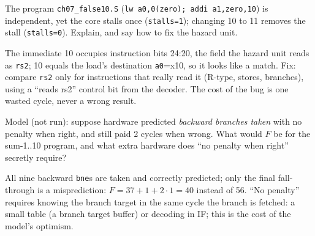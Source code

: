 \begin{exercise}[hard]\label{ex:h07d}
The program \texttt{ch07\_false10.S} (\texttt{lw a0,0(zero);
addi a1,zero,10}) is independent, yet the core stalls once
(\texttt{stalls=1}); changing 10 to 11 removes the stall
(\texttt{stalls=0}). Explain, and say how to fix the hazard unit.
\end{exercise}
\begin{solution}[hint]
The immediate 10 occupies instruction bits 24:20, the field the hazard
unit reads as \texttt{rs2}; 10 equals the load's destination
\texttt{a0}=x10, so it looks like a match. Fix: compare \texttt{rs2}
only for instructions that really read it (R-type, stores, branches),
using a ``reads rs2'' control bit from the decoder. The cost of the
bug is one wasted cycle, never a wrong result.
\end{solution}

\begin{exercise}[hard]\label{ex:h07e}
Model (not run): suppose hardware predicted \emph{backward branches
taken} with no penalty when right, and still paid 2 cycles when wrong.
What would $F$ be for the sum-1..10 program, and what extra hardware
does ``no penalty when right'' secretly require?
\end{exercise}
\begin{solution}[hint]
All nine backward \texttt{bne}s are taken and
correctly predicted; only the final fall-through is a misprediction:
$F=37+1+2\cdot1=40$ instead of 56. ``No penalty'' requires knowing the
branch target in the same cycle the branch is fetched: a small table
(a branch target buffer) or decoding in IF; this is the cost of the
model's optimism.
\end{solution}

\emergencystretch=0pt
